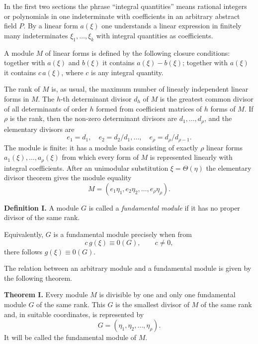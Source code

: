 \documentclass[11pt]{article}
\begin{document}
In the first two sections the phrase ``integral quantities'' means rational integers or polynomials in one indeterminate with coefficients in an arbitrary abstract field $P$. By a linear form $a(\xi)$ one understands a linear expression in finitely many indeterminates $\xi_1,\ldots,\xi_k$ with integral quantities as coefficients.

A module $M$ of linear forms is defined by the following closure conditions: together with $a(\xi)$ and $b(\xi)$ it contains $a(\xi)-b(\xi)$; together with $a(\xi)$ it contains $c\,a(\xi)$, where $c$ is any integral quantity.

The rank of $M$ is, as usual, the maximum number of linearly independent linear forms in $M$. The $h$-th determinant divisor $d_h$ of $M$ is the greatest common divisor of all determinants of order $h$ formed from coefficient matrices of $h$ forms of $M$. If $\rho$ is the rank, then the non-zero determinant divisors are $d_1,\ldots,d_\rho$, and the elementary divisors are
\[
  e_1=d_1,
  \quad e_2=d_2/d_1,
  \ldots,
  \quad e_\rho=d_\rho/d_{\rho-1}.
\]
The module is finite: it has a module basis consisting of exactly $\rho$ linear forms $a_1(\xi),\ldots,a_\rho(\xi)$ from which every form of $M$ is represented linearly with integral coefficients. After an unimodular substitution $\xi=\Theta(\eta)$ the elementary divisor theorem gives the module equality
\begin{equation}
  M=(e_1\eta_1,e_2\eta_2,\ldots,e_\rho\eta_\rho).                  \tag{1}
\end{equation}

\textbf{Definition I.} A module $G$ is called a \emph{fundamental module} if it has no proper divisor of the same rank.

Equivalently, $G$ is a fundamental module precisely when from
\begin{equation}
  c\,g(\xi)\equiv 0(G),\qquad c\ne 0,                              \tag{2}
\end{equation}
there follows $g(\xi)\equiv 0(G)$.

The relation between an arbitrary module and a fundamental module is given by the following theorem.

\textbf{Theorem I.} Every module $M$ is divisible by one and only one fundamental module $G$ of the same rank. This $G$ is the smallest divisor of $M$ of the same rank and, in suitable coordinates, is represented by
\begin{equation}
  G=(\eta_1,\eta_2,\ldots,\eta_\rho).                              \tag{3}
\end{equation}
It will be called the fundamental module of $M$.
\end{document}
